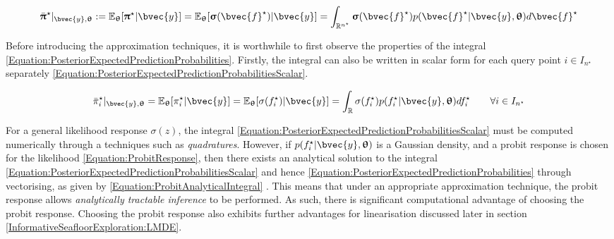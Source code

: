 			\begin{equation}
				\bar{\vec{\uppi}}^{\star} |_{\bvec{y}, \vec{\uptheta}} := \mathbb{E}_{\vec{\uptheta}}[\vec{\uppi}^{\star} | \bvec{y}] = \mathbb{E}_{\vec{\uptheta}}[\vec{\upsigma}(\bvec{f}^{\star}) | \bvec{y}] = \int_{\mathbb{R}^{n^{\star}}} \vec{\upsigma}(\bvec{f}^{\star}) p(\bvec{f}^{\star} | \bvec{y}, \vec{\uptheta}) d \bvec{f}^{\star}
			\label{Equation:PosteriorExpectedPredictionProbabilities}
			\end{equation}	
			
			Before introducing the approximation techniques, it is worthwhile to first observe the properties of the integral \eqref{Equation:PosteriorExpectedPredictionProbabilities}. Firstly, the integral can also be written in scalar form for each query point $i \in I_{n^{\star}}$ separately \eqref{Equation:PosteriorExpectedPredictionProbabilitiesScalar}.

			\begin{equation}
				 \bar{\pi}^{\star}_{i} |_{\bvec{y}, \vec{\uptheta}} = \mathbb{E}_{\vec{\uptheta}}[\pi^{\star}_{i} | \bvec{y}] = \mathbb{E}_{\vec{\uptheta}}[\sigma(f^{\star}_{i}) | \bvec{y}] = \int_{\mathbb{R}} \sigma(f^{\star}_{i}) p(f^{\star}_{i} | \bvec{y}, \vec{\uptheta}) d f^{\star}_{i} \qquad \forall i \in I_{n^{\star}}
			\label{Equation:PosteriorExpectedPredictionProbabilitiesScalar}
			\end{equation}		
						
			For a general likelihood response $\sigma(z)$, the integral \eqref{Equation:PosteriorExpectedPredictionProbabilitiesScalar} must be computed numerically through a techniques such as \textit{quadratures}. However, if $p(f^{\star}_{i} | \bvec{y}, \vec{\uptheta})$ is a Gaussian density, and a probit response is chosen for the likelihood \eqref{Equation:ProbitResponse}, then there exists an analytical solution to the integral \eqref{Equation:PosteriorExpectedPredictionProbabilitiesScalar} and hence \eqref{Equation:PosteriorExpectedPredictionProbabilities} through vectorising, as given by \eqref{Equation:ProbitAnalyticalIntegral} \citep{GaussianProcessForMachineLearning}. This means that under an appropriate approximation technique, the probit response allows \textit{analytically tractable inference} to be performed. As such, there is significant computational advantage of choosing the probit response. Choosing the probit response also exhibits further advantages for linearisation discussed later in section \ref{InformativeSeafloorExploration:LMDE}.
			
